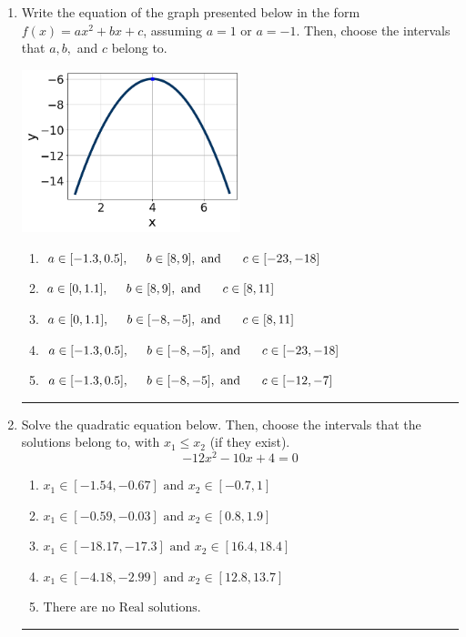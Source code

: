 \documentclass[14pt]{extbook}
\newcommand{\litem}[1]{\item#1\hspace*{-1cm}\rule{\textwidth}{0.4pt}}
\begin{document}
\begin{enumerate}
{\begin{enumerate}[label=\Alph*.]
\end{enumerate} }
\litem{
Write the equation of the graph presented below in the form $f(x)=ax^2+bx+c$, assuming  $a=1$ or $a=-1$. Then, choose the intervals that $a, b,$ and $c$ belong to.
\begin{center}
    \includegraphics[width=0.5\textwidth]{../Figures/quadraticGraphToEquationCopyC.png}
\end{center}
\begin{enumerate}[label=\Alph*.]
\item \( a \in [-1.3, 0.5], \hspace*{5mm} b \in [8, 9], \text{ and } \hspace*{5mm} c \in [-23, -18] \)
\item \( a \in [0, 1.1], \hspace*{5mm} b \in [8, 9], \text{ and } \hspace*{5mm} c \in [8, 11] \)
\item \( a \in [0, 1.1], \hspace*{5mm} b \in [-8, -5], \text{ and } \hspace*{5mm} c \in [8, 11] \)
\item \( a \in [-1.3, 0.5], \hspace*{5mm} b \in [-8, -5], \text{ and } \hspace*{5mm} c \in [-23, -18] \)
\item \( a \in [-1.3, 0.5], \hspace*{5mm} b \in [-8, -5], \text{ and } \hspace*{5mm} c \in [-12, -7] \)

\end{enumerate} }
\litem{
Solve the quadratic equation below. Then, choose the intervals that the solutions belong to, with $x_1 \leq x_2$ (if they exist).\[ -12x^{2} -10 x + 4 = 0 \]\begin{enumerate}[label=\Alph*.]
\item \( x_1 \in [-1.54, -0.67] \text{ and } x_2 \in [-0.7, 1] \)
\item \( x_1 \in [-0.59, -0.03] \text{ and } x_2 \in [0.8, 1.9] \)
\item \( x_1 \in [-18.17, -17.3] \text{ and } x_2 \in [16.4, 18.4] \)
\item \( x_1 \in [-4.18, -2.99] \text{ and } x_2 \in [12.8, 13.7] \)
\item \( \text{There are no Real solutions.} \)


\end{enumerate}}
\end{enumerate}
\end{document}
